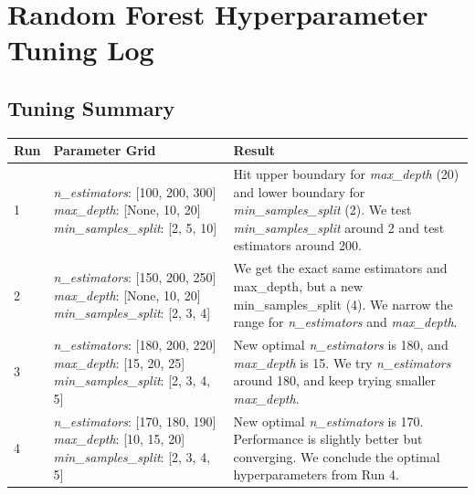 \documentclass{article}
\begin{document}
\section*{Random Forest Hyperparameter Tuning Log}



\subsection*{Tuning Summary}

\begin{table}[htbp]
\centering
\label{tab:rf_tuning_summary}
\begin{tabular}{@{}llp{6cm}@{}}
\toprule
\textbf{Run} & \textbf{Parameter Grid} & \textbf{Result} \\
\midrule
1 & \textit{n\_estimators}: [100, 200, 300] \newline
    \textit{max\_depth}: [None, 10, 20] \newline
    \textit{min\_samples\_split}: [2, 5, 10] & 
    Hit upper boundary for \textit{max\_depth} (20) and lower boundary for \textit{min\_samples\_split} (2). We test \textit{min\_samples\_split} around 2 and test estimators around 200. \\
\midrule
2 & \textit{n\_estimators}: [150, 200, 250] \newline
    \textit{max\_depth}: [None, 10, 20] \newline
    \textit{min\_samples\_split}: [2, 3, 4] & 
    We get the exact same estimators and max\_depth, but a new min\_samples\_split (4). We narrow the range for \textit{n\_estimators} and \textit{max\_depth}.\\
\midrule
3 & \textit{n\_estimators}: [180, 200, 220] \newline
    \textit{max\_depth}: [15, 20, 25] \newline
    \textit{min\_samples\_split}: [2, 3, 4, 5] & 
    New optimal \textit{n\_estimators} is 180, and \textit{max\_depth} is 15. We try \textit{n\_estimators} around 180, and keep trying smaller \textit{max\_depth}. \\
\midrule
4 & \textit{n\_estimators}: [170, 180, 190] \newline
    \textit{max\_depth}: [10, 15, 20] \newline
    \textit{min\_samples\_split}: [2, 3, 4, 5] & 
    New optimal \textit{n\_estimators} is 170. Performance is slightly better but converging. We conclude the optimal hyperparameters from Run 4. \\
\bottomrule
\end{tabular}
\end{table}
\end{document}
